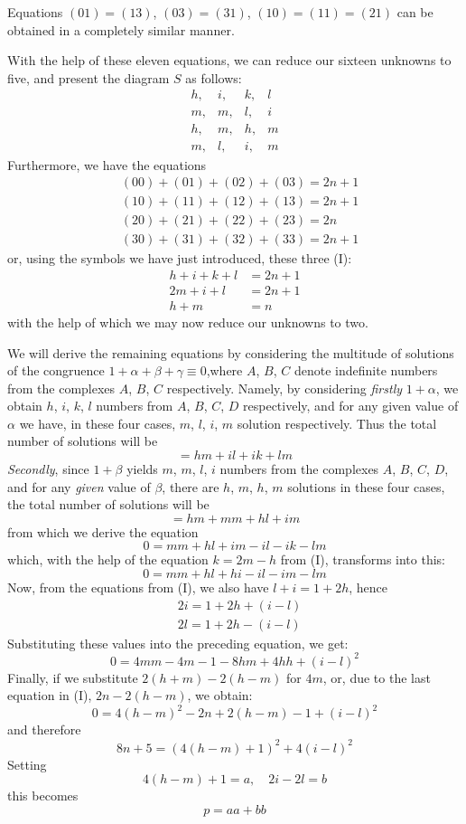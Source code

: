 \documentclass[twoside,12pt]{memoir}
\begin{document}
Equations \((01)=(13)\), \((03)=(31)\), \((10)=(11)=(21)\) can be obtained in a completely similar manner.

With the help of these eleven equations, we can reduce our sixteen unknowns to five, and present the diagram \(S\) as follows:
\[\begin{array}{llll}
h,&  i,& k,& l \\
m,& m,& l,& i \\
h,& m,& h,& m \\
m,& l,&  i,&  m
\end{array}\]\pagebreak%
Furthermore, we have the equations
\[\begin{aligned}
& (00)+(01)+(02)+(03)=2 n+1 \\
& (10)+(11)+(12)+(13)=2 n+1 \\
& (20)+(21)+(22)+(23)=2 n \\
& (30)+(31)+(32)+(33)=2 n+1
\end{aligned}\]
or, using the symbols we have just introduced, these three (I):
\[\begin{aligned}
h+i+k+l & =2 n+1 \\
2 m+i+l & =2 n+1 \\
h+m & =n
\end{aligned}\]
with the help of which we may now reduce our unknowns to two.  

We will derive the remaining equations by considering the multitude of solutions of the congruence \(1+\alpha+\beta+\gamma \equiv 0\),where \(A\), \(B\), \(C\) denote indefinite numbers from the complexes \(A\), \(B\), \(C\) respectively. Namely, by considering \textit{firstly} \(1+\alpha\), we obtain \(h\), \(i\), \(k\), \(l\) numbers from \(A\), \(B\), \(C\), \(D\) respectively, and for any given value of \(\alpha\) we have, in these four cases, \(m\), \(l\), \(i\), \(m\) solution respectively.  Thus the total number of solutions will be
\[=hm+il+ik+lm\]
\textit{Secondly}, since \(1+\beta\) yields \(m\), \(m\), \(l\), \(i\) numbers from the complexes \(A\), \(B\), \(C\), \(D\), and for any \textit{given} value of \(\beta\), there are \(h\), \(m\), \(h\), \(m\) solutions in these four cases, the total number of solutions will be
\[=h m+m m+h l+i m\]
from which we derive the equation
\[0=m m+h l+i m-i l-i k-l m\]
which, with the help of the equation \(k=2m-h\) from (I), transforms into this:
\[0=m m+h l+h i-i l-i m-l m\]
Now, from the equations from (I), we also have \(l+i=1+2h\), hence
\[\begin{aligned}
& 2i=1+2h+(i-l) \\
& 2l=1+2h-(i-l)
\end{aligned}\]\pagebreak%
Substituting these values into the preceding equation, we get:
\[0=4 m m-4 m-1-8 h m+4 h h+(i-l)^{2}\]
Finally, if we substitute \(2(h+m)-2(h-m)\) for \(4m\), or, due to the last equation in (I), \(2n-2(h-m)\), we obtain:
\[0=4(h-m)^{2}-2 n+2(h-m)-1+(i-l)^{2}\]
and therefore
\[8 n+5=(4(h-m)+1)^{2}+4(i-l)^{2}\]
Setting 
\[4(h-m)+1=a, \quad 2 i-2 l=b\]
this becomes
\[p=a a+b b\]
\end{document}

